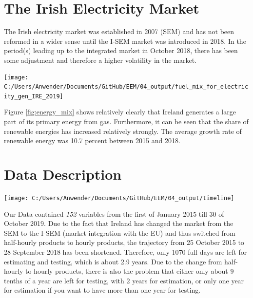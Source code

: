 \documentclass[12pt,a4paper]{article}
\let\origfigure\figure
\let\endorigfigure\endfigure
\renewenvironment{figure}[1][2] {
    \expandafter\origfigure\expandafter[H]
} {
    \endorigfigure
}
\begin{document}
\hypertarget{the-irish-electricity-market}{%
\section{The Irish Electricity
Market}\label{the-irish-electricity-market}}

The Irish electricity market was established in 2007 (\ac{SEM}) and has
not been reformed in a wider sense until the \ac{I-SEM} market was
introduced in 2018. In the period(s) leading up to the integrated market
in October 2018, there has been some adjustment and therefore a higher
volatility in the market.

\FloatBarrier
\begin{figure}

{\centering \texttt{[image: C:/Users/Anwender/Documents/GitHub/EEM/04\_output/fuel\_mix\_for\_electricity\_gen\_IRE\_2019]} 

}

\caption{ \label{fig:energy_mix} Primary fuel mix for electricity generation}\label{fig:fig_energy_mix}
\end{figure}
\FloatBarrier

Figure \ref{fig:energy_mix} shows relatively clearly that Ireland
generates a large part of its primary energy from gas. Furthermore, it
can be seen that the share of renewable energies has increased
relatively strongly. The average growth rate of renewable energy was
10.7 percent between 2015 and 2018. \autocite{dineen_energy_2019}

\hypertarget{data-description}{%
\section{Data Description}\label{data-description}}

\FloatBarrier
\begin{figure}

\texttt{[image: C:/Users/Anwender/Documents/GitHub/EEM/04\_output/timeline]} \hfill{}

\caption{ \label{fig:timeline} Half-hourly Day-Ahead Prices in Irland}\label{fig:fig_timeline}
\end{figure}
\FloatBarrier

Our Data contained \emph{152} variables from the first of January 2015
till 30 of October 2019. Due to the fact that Ireland has changed the
market from the \ac{SEM} to the \ac{I-SEM} (market integration with the
\ac{EU}) and thus switched from half-hourly products to hourly products,
the trajectory from 25 October 2015 to 28 September 2018 has been
shortened. Therefore, only 1070 full days are left for estimating and
testing, which is about 2.9 years. Due to the change from half-hourly to
hourly products, there is also the problem that either only about 9
tenths of a year are left for testing, with 2 years for estimation, or
only one year for estimation if you want to have more than one year for
testing. \autocite{cashman_i-sem_2019}
\end{document}
